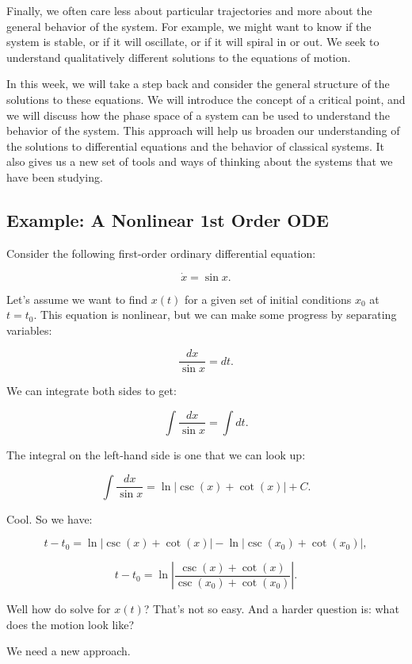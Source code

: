 \documentclass[11pt]{article}
\begin{document}
Finally, we often care less about particular trajectories and more about
the general behavior of the system. For example, we might want to know
if the system is stable, or if it will oscillate, or if it will spiral
in or out. We seek to understand qualitatively different solutions to
the equations of motion.

In this week, we will take a step back and consider the general
structure of the solutions to these equations. We will introduce the
concept of a critical point, and we will discuss how the phase space of
a system can be used to understand the behavior of the system. This
approach will help us broaden our understanding of the solutions to
differential equations and the behavior of classical systems. It also
gives us a new set of tools and ways of thinking about the systems that
we have been studying.

    \subsection{Example: A Nonlinear 1st Order
ODE}\label{example-a-nonlinear-1st-order-ode}

Consider the following first-order ordinary differential equation:

\[\dot{x} = \sin x.\]

Let's assume we want to find \(x(t)\) for a given set of initial
conditions \(x_0\) at \(t=t_0\). This equation is nonlinear, but we can
make some progress by separating variables:

\[\frac{dx}{\sin x} = dt.\]

We can integrate both sides to get:

\[\int \frac{dx}{\sin x} = \int dt.\]

The integral on the left-hand side is one that we can look up:

\[\int \frac{dx}{\sin x} = \ln\left|\csc\left(x\right) + \cot\left(x\right)\right| + C.\]

Cool. So we have:

\[t-t_0 = \ln\left|\csc\left(x\right) + \cot\left(x\right)\right| - \ln\left|\csc\left(x_0\right) + \cot\left(x_0\right)\right|,\]

\[t-t_0 = \ln\left|\frac{\csc\left(x\right) + \cot\left(x\right)}{\csc\left(x_0\right) + \cot\left(x_0\right)}\right|.\]

Well how do solve for \(x(t)\)? That's not so easy. And a harder
question is: what does the motion look like?

We need a new approach.
\end{document}
